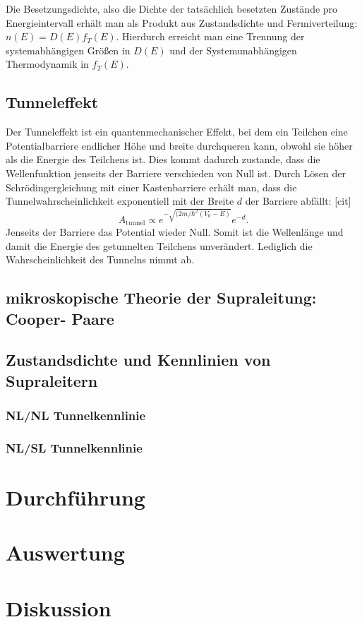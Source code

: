 \documentclass[twoside,        %
               BCOR12mm,       %
               english,ngerman, %
               fleqn,headsepline=false,footsepline=false
              ]{Vorlage/MFPREPORT}
\begin{document}
Die Besetzungsdichte, also die Dichte der tatsächlich besetzten Zustände pro
Energieintervall erhält man als
Produkt aus Zustandsdichte und Fermiverteilung: $n(E)=D(E)f_T(E)$. Hierdurch
erreicht man eine Trennung der systemabhängigen Größen in $D(E)$ und der
Systemunabhängigen Thermodynamik in $f_T(E)$.

\subsection{Tunneleffekt}
Der Tunneleffekt ist ein quantenmechanischer Effekt, bei dem ein Teilchen eine
Potentialbarriere endlicher Höhe und breite durchqueren kann, obwohl sie höher
als die Energie des Teilchens ist. Dies kommt dadurch zustande, dass die
Wellenfunktion jenseits der Barriere verschieden von Null ist. 
Durch Lösen der Schrödingergleichung mit einer Kastenbarriere erhält man,
dass die Tunnelwahrscheinlichkeit exponentiell mit der Breite $d$ der Barriere
abfällt: [cit]
\begin{equation}
    A_\text{tunnel}\propto e^{-\sqrt{(2m/\hbar^2 (V_0-E)}}e^{-d}.
\end{equation}
Jenseits der Barriere das Potential wieder Null. Somit ist die Wellenlänge und damit die Energie des getunnelten
Teilchens unverändert. Lediglich die Wahrscheinlichkeit des Tunnelns nimmt ab.

\subsection{mikroskopische Theorie der Supraleitung: Cooper- Paare}
\subsection{Zustandsdichte und Kennlinien von Supraleitern}
\subsubsection{NL/NL Tunnelkennlinie}
\subsubsection{NL/SL Tunnelkennlinie}
\section{Durchführung}
\label{sec:durchfuehrung}
\section{Auswertung}
\label{sec:auswertung}
\section{Diskussion}

\clearpage

%
%
%
%



\end{document}
